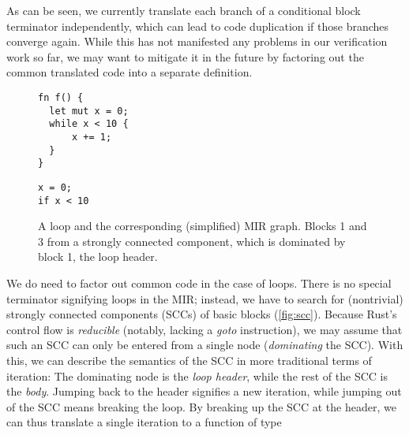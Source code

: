 As can be seen, we currently translate each branch of a conditional block
terminator independently, which can lead to code duplication if those branches
converge again. While this has not manifested any problems in our verification
work so far, we may want to mitigate it in the future by factoring out the
common translated code into a separate definition.

\begin{figure}[!b]
\hspace{1cm}\begin{minipage}{0.4\textwidth}
  \begin{verbatim}
fn f() {
  let mut x = 0;
  while x < 10 {
      x += 1;
  }
}
  \end{verbatim}
\end{minipage}
\begin{minipage}{0.4\textwidth}
  \newsavebox{\mintedbox}
  \begin{lrbox}{\mintedbox}
    \begin{minipage}{1.8cm}
\begin{verbatim}
x = 0;
if x < 10
\end{verbatim}
    \end{minipage}
  \end{lrbox}
\end{minipage}

\caption{A  loop and the corresponding (simplified) MIR graph.
  Blocks 1 and 3 from a strongly connected component, which is dominated by
  block 1, the loop header.}
\label{fig:scc}

\end{figure}

We do need to factor out common code in the case of loops. There is no special
terminator signifying loops in the MIR; instead, we have to search for
(nontrivial) strongly connected components (SCCs) of basic blocks (\autoref{fig:scc}). Because Rust's
control flow is \emph{reducible} (notably, lacking a \emph{goto} instruction),
we may assume that such an SCC can only be entered from a single node
(\emph{dominating} the SCC). With this, we can describe the semantics of the SCC
in more traditional terms of iteration: The dominating node is the \emph{loop
  header}, while the rest of the SCC is the \emph{body}. Jumping back to the
header signifies a new iteration, while jumping out of the SCC means breaking
the loop. By breaking up the SCC at the header, we can thus translate a single
iteration to a function of type

